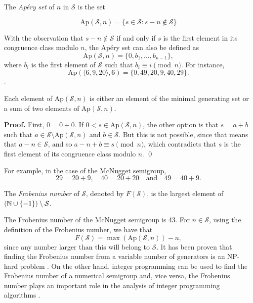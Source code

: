 \begin{definition}\label{def:smgps:aperyset}
    The \textit{Ap\'ery set} of $n$ in $\mathcal{S}$ is the set
\end{definition}
\[\mathrm{Ap}(\mathcal{S}, n) = \{s \in \mathcal{S} : s - n \notin \mathcal{S}\}\]

With the observation that $s - n \notin \mathcal{S}$ if and only if $s$ is the first element in its congruence class modulo $n$, the Apéry set can also be defined as  
\[\mathrm{Ap}(\mathcal{S}, n) =  \{0, b_1, \ldots, b_{n - 1}\},\]
where $b_i$ is the first element of $\mathcal{S}$ such that \(b_i \equiv i \pmod n\). 
For instance, \[\mathrm{Ap}(\langle 6, 9, 20 \rangle, 6) = \{0, 49, 20, 9, 40, 29\}.\]. 
\begin{proposition}
    Each element of $\mathrm{Ap}(\mathcal{S}, n)$ is either an element of the minimal generating set or a sum of two elements of $\mathrm{Ap}(\mathcal{S}, n)$. 
\end{proposition}
\textbf{Proof. } First, $0 = 0 + 0$. If $0 < s \in \mathrm{Ap}(\mathcal{S}, n)$, the other option is that $s = a + b$ such that $a \in \mathcal{S}\setminus\mathrm{Ap}(\mathcal{S}, n)$ and $b \in \mathcal{S}$. But this is not possible, since that means that $a - n \in \mathcal{S}$, and so $a - n + b \equiv s \pmod{n}$, which contradicts that $s$ is the first element of its congruence class modulo $n$. \qed \par  
For example, in the case of the McNugget semigroup,
\[29 = 20 + 9, \quad 40 = 20 + 20 \quad \text{and} \quad 49 = 40 + 9.\]
\begin{definition}\label{def:smgps:frobeniusnum}
    The \textit{Frobenius number} of $\mathcal{S}$, denoted by $F(\mathcal{S})$, is the largest element of $(\mathbb{N} \cup \{-1\}) \setminus \mathcal{S}$.
\end{definition}

The Frobenius number of the McNugget semigroup is 43. For $n \in \mathcal{S}$, using the definition of the Frobenius number, we have that
\begin{equation}\label{eq:smgps:selmer1}
    F(\mathcal{S}) = \max (\mathrm{Ap}(\mathcal{S}, n)) - n,
\end{equation}
since any number larger than this will belong to $\mathcal{S}$. It has been proven that finding the Frobenius number from a variable number of generators is an NP-hard problem \cite{ramirez1996complexity}. On the other hand, integer programming can be used to find the Frobenius number of a numerical semigroup and, vice versa, the Frobenius number plays an important role in the analysis of integer programming algorithms \cite{aliev2011expected}.

